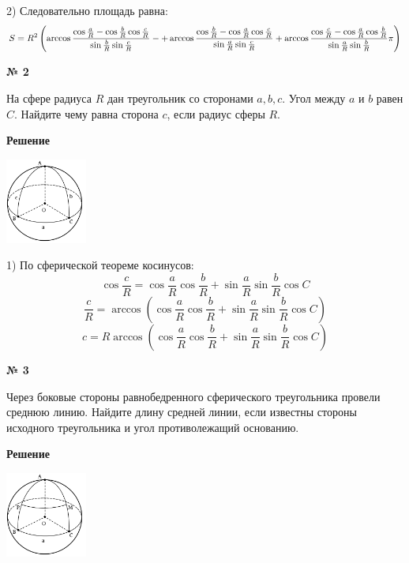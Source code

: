     2) Следовательно площадь равна:
    \[
        S = R^2\left(\arccos \frac{\cos \frac{a}{R} - \cos \frac{b}{R}\cos\frac{c}{R}}{\sin \frac{b}{R}\sin\frac{c}{R}} -
        + \arccos  \frac{\cos \frac{b}{R} - \cos \frac{a}{R}\cos\frac{c}{R}}{\sin \frac{a}{R}\sin\frac{c}{R}}
        + \arccos \frac{\cos \frac{c}{R} - \cos \frac{a}{R}\cos\frac{b}{R}}{\sin \frac{a}{R}\sin\frac{b}{R}}\\
        \pi\right)
    \]

    \begin{center}
        \textbf{№ 2}
    \end{center}

    На сфере радиуса $R$ дан треугольник со сторонами $a, b, c$.
    Угол между $a$ и $b$ равен $C$.
    Найдите чему равна сторона $c$, если радиус сферы $R$.

    \textbf{Решение}\\

    \begin{center}
        \includegraphics[width=0.2\textwidth]{images/img4}\\
    \end{center}

    1) По сферической теореме косинусов:
    \[
        \cos \frac{c}{R} = \cos\frac{a}{R}\cos\frac{b}{R} + \sin\frac{a}{R}\sin\frac{b}{R}\cos C
    \]
    \[
        \frac{c}{R} = \arccos\left( \cos\frac{a}{R}\cos\frac{b}{R} + \sin\frac{a}{R}\sin\frac{b}{R}\cos C\right)
    \]
    \[
        c = R\arccos\left( \cos\frac{a}{R}\cos\frac{b}{R} + \sin\frac{a}{R}\sin\frac{b}{R}\cos C\right)
    \]

    \begin{center}
        \textbf{№ 3}
    \end{center}

    Через боковые стороны равнобедренного сферического треугольника провели среднюю линию.
    Найдите длину средней линии, если известны стороны исходного треугольника и угол противолежащий основанию.

    \textbf{Решение}\\

    \begin{center}
        \includegraphics[width=0.2\textwidth]{images/img5}\\
    \end{center}

